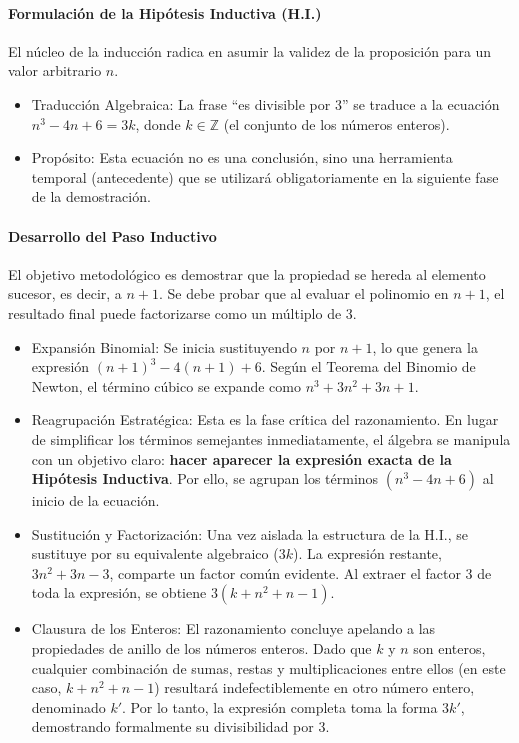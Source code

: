 \documentclass{article}
\begin{document}
\paragraph{Formulación de la Hipótesis Inductiva (H.I.)}
El núcleo de la inducción radica en asumir la validez de la proposición para un valor arbitrario $n$.
\begin{itemize}
    \item Traducción Algebraica: La frase ``es divisible por 3'' se traduce a la ecuación $n^3 - 4n + 6 = 3k$, donde $k \in \mathbb{Z}$ (el conjunto de los números enteros).
    \item Propósito: Esta ecuación no es una conclusión, sino una herramienta temporal (antecedente) que se utilizará obligatoriamente en la siguiente fase de la demostración.
\end{itemize}

\paragraph{Desarrollo del Paso Inductivo}
El objetivo metodológico es demostrar que la propiedad se hereda al elemento sucesor, es decir, a $n+1$. Se debe probar que al evaluar el polinomio en $n+1$, el resultado final puede factorizarse como un múltiplo de $3$.
\begin{itemize}
    \item Expansión Binomial: Se inicia sustituyendo $n$ por $n+1$, lo que genera la expresión $(n+1)^3 - 4(n+1) + 6$. Según el Teorema del Binomio de Newton, el término cúbico se expande como $n^3 + 3n^2 + 3n + 1$.
    \item Reagrupación Estratégica: Esta es la fase crítica del razonamiento. En lugar de simplificar los términos semejantes inmediatamente, el álgebra se manipula con un objetivo claro: \textbf{hacer aparecer la expresión exacta de la Hipótesis Inductiva}. Por ello, se agrupan los términos $(n^3 - 4n + 6)$ al inicio de la ecuación.
    \item Sustitución y Factorización: Una vez aislada la estructura de la H.I., se sustituye por su equivalente algebraico ($3k$). La expresión restante, $3n^2 + 3n - 3$, comparte un factor común evidente. Al extraer el factor $3$ de toda la expresión, se obtiene $3(k + n^2 + n - 1)$.
    \item Clausura de los Enteros: El razonamiento concluye apelando a las propiedades de anillo de los números enteros. Dado que $k$ y $n$ son enteros, cualquier combinación de sumas, restas y multiplicaciones entre ellos (en este caso, $k + n^2 + n - 1$) resultará indefectiblemente en otro número entero, denominado $k'$. Por lo tanto, la expresión completa toma la forma $3k'$, demostrando formalmente su divisibilidad por $3$.
\end{itemize}
\end{document}
